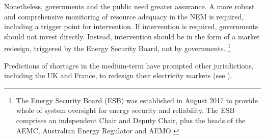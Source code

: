 \documentclass[FrontPage]{grattan}
\begin{document}
Nonetheless, governments and the public need greater assurance. A more robust and comprehensive monitoring of resource adequacy in the NEM is required, including a trigger point for intervention. If intervention is required, governments should not invest directly. Instead, intervention should be in the form of a market redesign, triggered by the Energy Security Board, not by governments.%
\footnote{The Energy Security Board (ESB) was established in August 2017 to provide whole of system oversight for energy security and reliability. The ESB comprises an independent Chair and Deputy Chair, plus the heads of the AEMC, Australian Energy Regulator and AEMO.}

Predictions of shortages in the medium-term have prompted other jurisdictions, including the UK and France, to redesign their electricity markets (see ).
\end{document}
